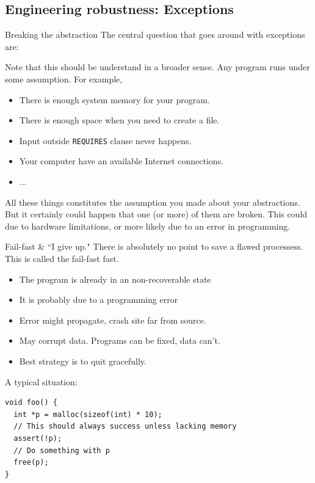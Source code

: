 \subsection{Engineering robustness: Exceptions}
\begin{frame}{Breaking the abstraction}
The central question that goes around with exceptions are:
\begin{center}
\end{center}
Note that this should be understand in a broader sense. Any program runs under some assumption. For example, 
\begin{itemize}
	\item There is enough system memory for your program.
	\item There is enough space when you need to create a file.
	\item Input outside \texttt{REQUIRES} clause never happens. 
	\item Your computer have an available Internet connections.
	\item ...
\end{itemize}
All these things constitutes the assumption you made about your abstractions. But it certainly could happen that one (or more) of them are broken. This could due to hardware limitations, or more likely due to an error in programming. 
\end{frame}

\begin{frame}[fragile]{Fail-fast \& ``I give up."}
\alert{There is absolutely no point to save a flawed processess}. This is called the fail-fast fast.
\begin{itemize}
	\item The program is already in an non-recoverable state
	\item It is probably due to a programming error
	\item Error might propagate, crash site far from source.
	\item May corrupt data. Programs can be fixed, data can't.
	\item Best strategy is to quit gracefully.
\end{itemize}
A typical situation:
\begin{verbatim}
void foo() {
  int *p = malloc(sizeof(int) * 10);
  // This should always success unless lacking memory
  assert(!p);
  // Do something with p
  free(p);
}
\end{verbatim}
\end{frame}

